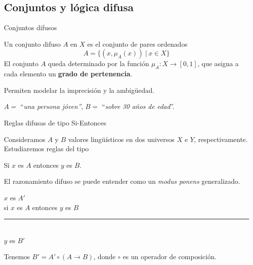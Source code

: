 \documentclass[10pt, spanish]{beamer}
\begin{document}
\subsection{Conjuntos y lógica difusa}


\begin{frame}{Conjuntos difusos}
\begin{definition}
	Un conjunto difuso $A$ en $X$ es el conjunto de pares ordenados
\[
A = \{ (x, \mu_A(x)) \ | \ x \in X \}
\]
El conjunto $A$ queda determinado por la función $\mu_A: X \longrightarrow [0,1]$, que asigna a cada elemento un \textbf{grado de pertenencia}.
\end{definition}

\vspace{1em}
Permiten modelar la imprecisión y la ambigüedad.
\begin{example}
	$A =$ ``\textit{una persona jóven''}, $B=$ ``\textit{sobre 30 años de edad}''.
\end{example}
\end{frame}

\begin{frame}{Reglas difusas de tipo Si-Entonces}
  \begin{exampleblock}{\vspace*{-3ex}}

	Consideramos $A$ y $B$ valores lingüísticos en dos universos $X$ e $Y$, respectivamente. Estudiaremos reglas del tipo\\

\begin{center}
	Si $x$ es $A$ entonces $y$ es $B$.
\end{center}
\end{exampleblock}
El razonamiento difuso se puede entender como un \textit{modus ponens} generalizado.
\vspace{-.5em}
  \begin{exampleblock}{\vspace*{-3ex}}
\begin{center}
	$x$ es $A'$\\
    si $x$ es $A$ entonces $y$ es $B$\\
    \rule{5cm}{0.4pt}\\
    $y$ es $B'$
\end{center}

Tenemos $B' = A' \circ (A \to B)$, donde $\circ$ es un operador de composición.
\end{exampleblock}
\end{frame}
\end{document}
